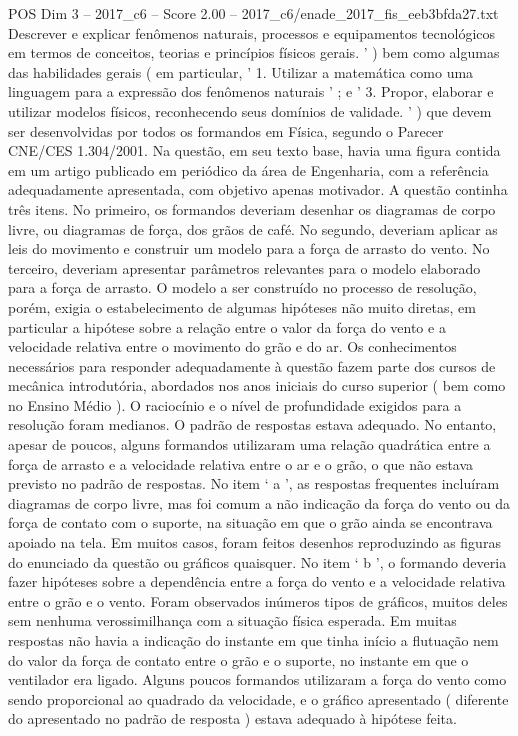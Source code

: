 \begin{textsample}{POS Dim 3 – 2017\_c6 – Score 2.00 – 2017\_c6/enade\_2017\_fis\_eeb3bfda27.txt}
Descrever e explicar fenômenos naturais, processos e equipamentos tecnológicos em termos de conceitos, teorias e princípios físicos gerais. ' ) bem como algumas das habilidades gerais ( em particular, ' 1.
Utilizar a matemática como uma linguagem para a expressão dos fenômenos naturais ' ; e ' 3.
Propor, elaborar e utilizar modelos físicos, reconhecendo seus domínios de validade. ' ) que devem ser desenvolvidas por todos os formandos em Física, segundo o Parecer CNE/CES 1.304/2001.
Na questão, em seu texto base, havia uma figura contida em um artigo publicado em periódico da área de Engenharia, com a referência adequadamente apresentada, com objetivo apenas motivador.
A questão continha três itens.
No primeiro, os formandos deveriam desenhar os diagramas de corpo livre, ou diagramas de força, dos grãos de café.
No segundo, deveriam aplicar as leis do movimento e construir um modelo para a força de arrasto do vento.
No terceiro, deveriam apresentar parâmetros relevantes para o modelo elaborado para a força de arrasto.
O modelo a ser construído no processo de resolução, porém, exigia o estabelecimento de algumas hipóteses não muito diretas, em particular a hipótese sobre a relação entre o valor da força do vento e a velocidade relativa entre o movimento do grão e do ar.
Os conhecimentos necessários para responder adequadamente à questão fazem parte dos cursos de mecânica introdutória, abordados nos anos iniciais do curso superior ( bem como no Ensino Médio ).
O raciocínio e o nível de profundidade exigidos para a resolução foram medianos.
O padrão de respostas estava adequado.
No entanto, apesar de poucos, alguns formandos utilizaram uma relação quadrática entre a força de arrasto e a velocidade relativa entre o ar e o grão, o que não estava previsto no padrão de respostas.
No item ‘ a ’, as respostas frequentes incluíram diagramas de corpo livre, mas foi comum a não indicação da força do vento ou da força de contato com o suporte, na situação em que o grão ainda se encontrava apoiado na tela.
Em muitos casos, foram feitos desenhos reproduzindo as figuras do enunciado da questão ou gráficos quaisquer.
No item ‘ b ’, o formando deveria fazer hipóteses sobre a dependência entre a força do vento e a velocidade relativa entre o grão e o vento.
Foram observados inúmeros tipos de gráficos, muitos deles sem nenhuma verossimilhança com a situação física esperada.
Em muitas respostas não havia a indicação do instante em que tinha início a flutuação nem do valor da força de contato entre o grão e o suporte, no instante em que o ventilador era ligado.
Alguns poucos formandos utilizaram a força do vento como sendo proporcional ao quadrado da velocidade, e o gráfico apresentado ( diferente do apresentado no padrão de resposta ) estava adequado à hipótese feita.

\end{textsample}
